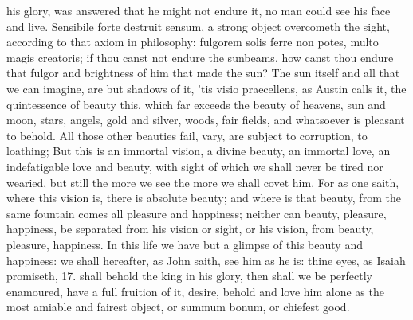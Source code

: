 {his glory, was answered that he might not endure it, no man could see
his face and live. Sensibile forte destruit sensum, a strong object
overcometh the sight, according to that axiom in philosophy: fulgorem
solis ferre non potes, multo magis creatoris; if thou canst not endure
the sunbeams, how canst thou endure that fulgor and brightness of him
that made the sun? The sun itself and all that we can imagine, are but
shadows of it, 'tis visio praecellens, as Austin calls it, the
quintessence of beauty this, which far exceeds the beauty of heavens,
sun and moon, stars, angels, gold and silver, woods, fair fields, and
whatsoever is pleasant to behold. All those other beauties fail, vary,
are subject to corruption, to loathing; But this is an immortal
vision, a divine beauty, an immortal love, an indefatigable love and
beauty, with sight of which we shall never be tired nor wearied, but
still the more we see the more we shall covet him. For as one
saith, where this vision is, there is absolute beauty; and where is
that beauty, from the same fountain comes all pleasure and happiness;
neither can beauty, pleasure, happiness, be separated from his vision
or sight, or his vision, from beauty, pleasure, happiness. In this life
we have but a glimpse of this beauty and happiness: we shall hereafter,
as John saith, see him as he is: thine eyes, as Isaiah promiseth,
 17. shall behold the king in his glory, then shall we be
perfectly enamoured, have a full fruition of it, desire, behold
and love him alone as the most amiable and fairest object, or summum
bonum, or chiefest good.

}

